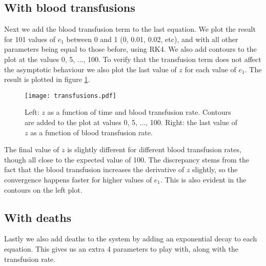 \documentclass[a4paper,10pt]{article}
\begin{document}
	\subsection*{With blood transfusions}
	Next we add the blood transfusion term to the last equation. We plot the result for 101 values of $ e_1 $ between 0 and 1 (0, 0.01, 0.02, etc), and with all other parameters being equal to those before, using RK4. We also add contours to the plot at the values 0, 5, ..., 100. To verify that the transfusion term does not affect the asymptotic behaviour we also plot the last value of $ z $ for each value of $ e_1 $. The result is plotted in figure \ref{fig:transfusions}. 
	\begin{figure}[H]
		\centering
		\texttt{[image: transfusions.pdf]}
		\caption{Left: $ z $ as a function of time and blood transfusion rate. Contours are added to the plot at values 0, 5, ..., 100. Right: the last value of $ z $ as a function of blood transfusion rate.}
		\label{fig:transfusions}
	\end{figure}
	The final value of $ z $ is slightly different for different blood transfusion rates, though all close to the expected value of 100. The discrepancy stems from the fact that the blood transfusion increases the derivative of $ z $ slightly, so the convergence happens faster for higher values of $ e_1 $. This is also evident in the contours on the left plot.
	
	\subsection*{With deaths}
	Lastly we also add deaths to the system by adding an exponential decay to each equation. This gives us an extra 4 parameters to play with, along with the transfusion rate.
	
\end{document}

